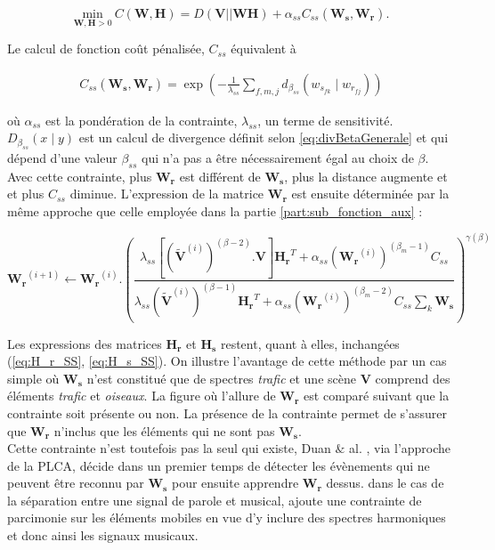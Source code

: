 \begin{equation}
\underset{\mathbf{W}, \mathbf{H} > 0}{\text{min}}~ C(\mathbf{W},\mathbf{H}) = D(\mathbf{V}\vert\vert \mathbf{WH}) + \alpha_{ss} C_{ss}(\mathbf{W_s},\mathbf{W_r}).
\end{equation}

Le calcul de fonction coût pénalisée, $C_{ss}$ équivalent à  

\begin{align}
C_{ss}(\mathbf{W_s},\mathbf{W_r}) = \exp\left(-\frac{1}{\lambda_{ss}}\sum_{f,m,j}d_{\beta_{ss}}(w_{s_{fk}} \mid w_{r_{fj}})\right)
\end{align}

où $\alpha_{ss}$ est la pondération de la contrainte, $\lambda_{ss}$, un terme de sensitivité. $D_{\beta_{ss}}(x \mid y)$ est un calcul de divergence définit selon \ref{eq:divBetaGenerale} et qui dépend d'une valeur $\beta_{ss}$ qui n'a pas a être nécessairement égal au choix de $\beta$. Avec cette contrainte, plus $\mathbf{W_r}$ est différent de $\mathbf{W_s}$, plus la distance augmente et et plus $C_{ss}$ diminue.  L'expression de la matrice $\mathbf{W_r}$ est ensuite déterminée par la même approche que celle employée dans la partie \ref{part:sub_fonction_aux} : 

\begin{equation}
\mathbf{W_r}^{(i+1)} \leftarrow \mathbf{W_r}^{(i)}.\left(\frac{\lambda_{ss}\left[\left(\mathbf{\tilde{V}}^{(i)} \right)^{(\beta-2)}.\mathbf{V} \right]\mathbf{H_r}^T+\alpha_{ss}\left(\mathbf{W_r}^{(i)}\right)^{(\beta_m-1)}C_{ss}}{\lambda_{ss}\left(\mathbf{\tilde{V}}^{(i)} \right)^{(\beta-1)}\mathbf{H_r}^T+\alpha_{ss}\left(\mathbf{W_r}^{(i)}\right)^{(\beta_m-2)}C_{ss}\sum_k \mathbf{W_s}} \right)^{\gamma(\beta)}
\end{equation}

Les expressions des matrices $\mathbf{H_r}$ et $\mathbf{H_s}$ restent, quant à elles, inchangées (\ref{eq:H_r_SS}, \ref{eq:H_s_SS}). On illustre l'avantage de cette méthode par un cas simple où $\mathbf{W_s}$ n'est constitué que de spectres \textit{trafic} et une scène $\mathbf{V}$ comprend des éléments \textit{trafic} et \textit{oiseaux}. La figure où l'allure de $\mathbf{W_r}$ est comparé suivant que la contrainte soit présente ou non. La présence de la contrainte permet de s'assurer que $\mathbf{W_r}$ n'inclus que les éléments qui ne sont pas $\mathbf{W_s}$.\\

Cette contrainte n'est toutefois pas la seul qui existe, Duan $\&$ al. \cite{duan_online_2012}, via l'approche de la PLCA, décide dans un premier temps de détecter les évènements qui ne peuvent être reconnu par $\mathbf{W_s}$ pour ensuite apprendre $\mathbf{W_r}$ dessus. \cite{} dans le cas de la séparation entre une signal de parole et musical, ajoute une contrainte de parcimonie sur les éléments mobiles en vue d'y inclure des spectres harmoniques et donc ainsi les signaux musicaux.
 

